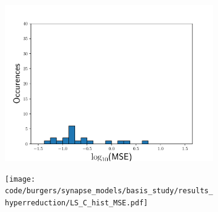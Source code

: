 \documentclass[3p,computermodern,10pt]{elsarticle}
\begin{document}
\begin{figure}
\begin{center}
\begin{subfigure}[t]{0.33\textwidth}
\includegraphics[trim={0cm 0cm 0cm 0cm},clip,width=1.0\linewidth]{code/burgers/synapse_models/basis_study/results_hyperreduction/LS_hist_MSE.pdf}
\caption{\PSTLSROMGNAT}
\end{subfigure}
\begin{subfigure}[t]{0.33\textwidth}
\texttt{[image: code/burgers/synapse\_models/basis\_study/results\_hyperreduction/LS\_C\_hist\_MSE.pdf]}
\caption{\PSTLSROMCOLLOC}
\end{subfigure}


\end{center}
\end{figure}
\end{document}
